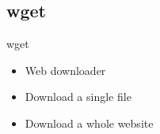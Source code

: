 
\subsection{wget}

\begin{frame}[fragile]{wget}
  \begin{itemize}
    \pause \item Web downloader
    \pause \item Download a single file
    \pause \item Download a whole website
  \end{itemize}
\end{frame}
